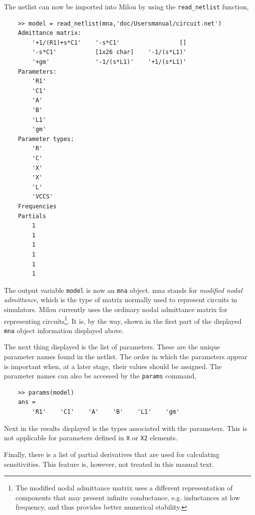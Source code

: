 The netlist can now be imported into Milou by using the
\verb"read_netlist" function,
\begin{small}
\begin{verbatim}
    >> model = read_netlist(mna,'doc/Usersmanual/circuit.net')
    Admittance matrix:
        '+1/(R1)+s*C1'    '-s*C1'                 []
        '-s*C1'           [1x26 char]    '-1/(s*L1)'
        '+gm'             '-1/(s*L1)'    '+1/(s*L1)'
    Parameters:
        'R1'
        'C1'
        'A'
        'B'
        'L1'
        'gm'
    Parameter types:
        'R'
        'C'
        'X'
        'X'
        'L'
        'VCCS'
    Frequencies
    Partials
        1
        1
        1
        1
        1
        1
\end{verbatim}
\end{small}

The output variable \verb"model" is now an \verb"mna" object. mna
stands for \emph{modified nodal admittance}, which is the type of
matrix normally used to represent circuits in simulators. Milou
currently uses the ordinary nodal admittance matrix for
representing circuits\footnote{The modified nodal admittance
matrix uses a different representation of components that may
present infinite conductance, e.g. inductances at low frequency,
and thus provides better numerical stability.}. It is, by the way,
shown in the first part of the displayed \verb"mna" object
information displayed above.

The next thing displayed is the list of parameters. These are the
unique parameter names found in the netlist. The order in which
the parameters appear is important when, at a later stage, their
values should be assigned. The parameter names can also be
accessed by the \verb"params" command,
\begin{small}
\begin{verbatim}
    >> params(model)
    ans =
        'R1'    'C1'    'A'    'B'    'L1'    'gm'
\end{verbatim}
\end{small}

Next in the results displayed is the types associated with the parameters.
This is not applicable for parameters defined in \verb"X" or
\verb"X2" elements.

Finally, there is a list of partial derivatives that are used for
calculating sensitivities. This feature is, however, not treated
in this manual text.

